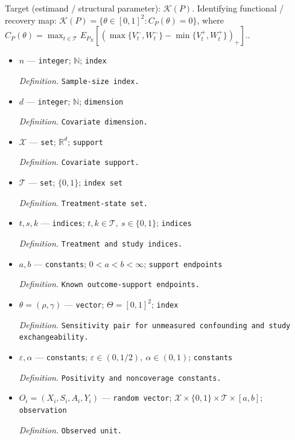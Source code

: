 \documentclass{article}
\begin{document}
Target (estimand / structural parameter): \(\mathcal K(P)\).
Identifying functional / recovery map: \(\mathcal K(P)=\{\theta\in[0,1]^2:C_P(\theta)=0\}\), where \(C_P(\theta)=\max_{t\in\mathcal T}E_{P_X}[(\max\{V_t^-,W_t^-\}-\min\{V_t^+,W_t^+\})_+]\)..
\begin{itemize}
  \item \(n\) --- \texttt{integer}; \(\mathbb N\); \texttt{index}
  \par\smallskip\noindent\emph{Definition.} \texttt{Sample-\allowbreak{}size index.}
  \item \(d\) --- \texttt{integer}; \(\mathbb N\); \texttt{dimension}
  \par\smallskip\noindent\emph{Definition.} \texttt{Covariate dimension.}
  \item \(\mathcal X\) --- \texttt{set}; \(\mathbb R^d\); \texttt{support}
  \par\smallskip\noindent\emph{Definition.} \texttt{Covariate support.}
  \item \(\mathcal T\) --- \texttt{set}; \(\{0,1\}\); \texttt{index set}
  \par\smallskip\noindent\emph{Definition.} \texttt{Treatment-\allowbreak{}state set.}
  \item \(t,s,k\) --- \texttt{indices}; \(t,k\in\mathcal T,\ s\in\{0,1\}\); \texttt{indices}
  \par\smallskip\noindent\emph{Definition.} \texttt{Treatment and study indices.}
  \item \(a,b\) --- \texttt{constants}; \(0<a<b<\infty\); \texttt{support endpoints}
  \par\smallskip\noindent\emph{Definition.} \texttt{Known outcome-\allowbreak{}support endpoints.}
  \item \(\theta=(\rho,\gamma)\) --- \texttt{vector}; \(\Theta=[0,1]^2\); \texttt{index}
  \par\smallskip\noindent\emph{Definition.} \texttt{Sensitivity pair for unmeasured confounding and study exchangeability.}
  \item \(\varepsilon,\alpha\) --- \texttt{constants}; \(\varepsilon\in(0,1/2),\ \alpha\in(0,1)\); \texttt{constants}
  \par\smallskip\noindent\emph{Definition.} \texttt{Positivity and noncoverage constants.}
  \item \(O_i=(X_i,S_i,A_i,Y_i)\) --- \texttt{random vector}; \(\mathcal X\times\{0,1\}\times\mathcal T\times[a,b]\); \texttt{observation}
  \par\smallskip\noindent\emph{Definition.} \texttt{Observed unit.}

\end{itemize}
\end{document}
